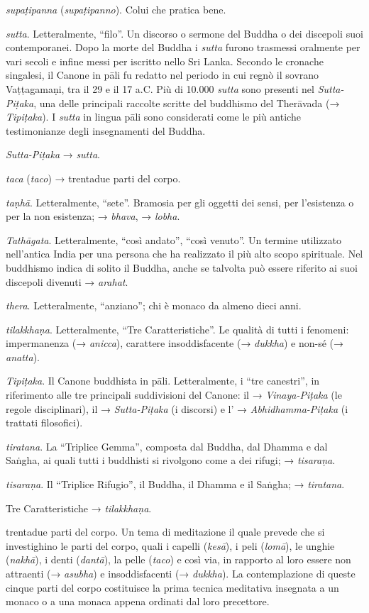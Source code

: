 \emph{supaṭipanna} (\emph{supaṭipanno}). Colui che pratica bene.

\emph{sutta}. Letteralmente, ``filo''. Un discorso o sermone del Buddha
o dei discepoli suoi contemporanei. Dopo la morte del Buddha i
\emph{sutta} furono trasmessi oralmente per vari secoli e infine messi
per iscritto nello Sri Lanka. Secondo le cronache singalesi, il Canone
in pāli fu redatto nel periodo in cui regnò il sovrano Vaṭṭagamaṇi, tra
il 29 e il 17 a.C. Più di 10.000 \emph{sutta} sono presenti nel
\emph{Sutta-Piṭaka}, una delle principali raccolte scritte del buddhismo
del Therāvada (→ \emph{Tipiṭaka}). I \emph{sutta} in lingua pāli sono
considerati come le più antiche testimonianze degli insegnamenti del
Buddha.

\emph{Sutta-Piṭaka} → \emph{sutta}.

\emph{taca} (\emph{taco}) → trentadue parti del corpo.

\emph{taṇhā}. Letteralmente, ``sete''. Bramosia per gli oggetti dei
sensi, per l'esistenza o per la non esistenza; → \emph{bhava}, →
\emph{lobha}.

\emph{Tathāgata}. Letteralmente, ``così andato'', ``così venuto''. Un
termine utilizzato nell'antica India per una persona che ha realizzato
il più alto scopo spirituale. Nel buddhismo indica di solito il Buddha,
anche se talvolta può essere riferito ai suoi discepoli divenuti →
\emph{arahat}.

\emph{thera}. Letteralmente, ``anziano''; chi è monaco da almeno dieci
anni.

\emph{tilakkhaṇa}. Letteralmente, ``Tre Caratteristiche''. Le qualità di
tutti i fenomeni: impermanenza (→ \emph{anicca}), carattere
insoddisfacente (→ \emph{dukkha}) e non-sé (→ \emph{anatta}).

\emph{Tipiṭaka}. Il Canone buddhista in pāli. Letteralmente, i ``tre
canestri'', in riferimento alle tre principali suddivisioni del Canone:
il → \emph{Vinaya-Piṭaka} (le regole disciplinari), il →
\emph{Sutta-Piṭaka} (i discorsi) e l' → \emph{Abhidhamma-Piṭaka} (i
trattati filosofici).

\emph{tiratana}. La ``Triplice Gemma'', composta dal Buddha, dal Dhamma
e dal Saṅgha, ai quali tutti i buddhisti si rivolgono come a dei rifugi;
→ \emph{tisaraṇa}.

\emph{tisaraṇa}. Il ``Triplice Rifugio'', il Buddha, il Dhamma e il
Saṅgha; → \emph{tiratana}.

Tre Caratteristiche → \emph{tilakkhaṇa}.

trentadue parti del corpo. Un tema di meditazione il quale prevede che
si investighino le parti del corpo, quali i capelli (\emph{kesā}), i
peli (\emph{lomā}), le unghie (\emph{nakhā}), i denti (\emph{dantā}), la
pelle (\emph{taco}) e così via, in rapporto al loro essere non attraenti
(→ \emph{asubha}) e insoddisfacenti (→ \emph{dukkha}). La contemplazione
di queste cinque parti del corpo costituisce la prima tecnica meditativa
insegnata a un monaco o a una monaca appena ordinati dal loro
precettore.

